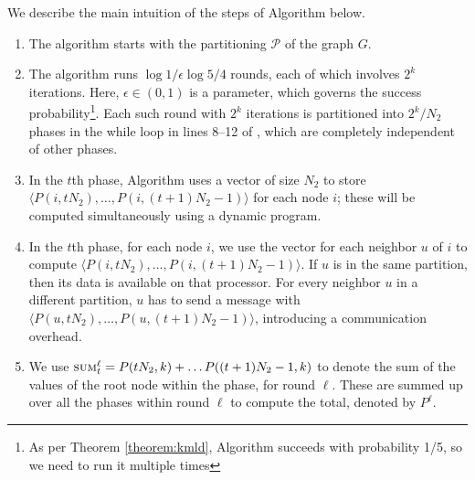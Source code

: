
We describe the main intuition of the steps of Algorithm \parmaxwt{} below.
\begin{enumerate}
\item
The algorithm starts with the partitioning $\mathcal{P}$ of the graph $G$.
\item
The algorithm runs $\log{1/\epsilon}\log{5/4}$ rounds, each of which involves $2^k$ iterations.
Here, $\epsilon\in(0, 1)$ is a parameter, which governs the success probability\footnote{As per Theorem \ref{theorem:kmld}, Algorithm \maxwt{} succeeds with probability 1/5, so we need to run it multiple times}. Each such round with $2^k$ iterations is partitioned into
$2^k/N_2$ phases in the while loop in lines 8--12 of \parmaxwt{}, which are completely independent of other phases.
\item
In the $t$th phase, Algorithm \parcircuit{} uses a vector of size $N_2$ to store
$\langle P(i, tN_2),\ldots, P(i, (t+1)N_2-1)\rangle$ for each node $i$; these
will be computed simultaneously using a dynamic program.
\item
In the $t$th phase, for each node $i$, we use the vector for each neighbor $u$ of $i$ to compute $\langle P(i, tN_2),\ldots, P(i, (t+1)N_2-1)\rangle$.
If $u$ is in the same partition, then its data is available on that processor. For every neighbor $u$ in a different partition, $u$ has to send a message with $\langle P(u, tN_2),\ldots, P(u, (t+1)N_2-1)\rangle$, introducing a communication overhead.
\item
We use $\textsc{sum}^{\ell}_t = P(tN_2, k) + \ldots P((t+1)N_2-1, k)$ 
to denote the sum of the values of the root node within the phase, for round $\ell$. These are summed up
over all the phases within round $\ell$ to compute the total, denoted by $P^{\ell}$.
\end{enumerate}

